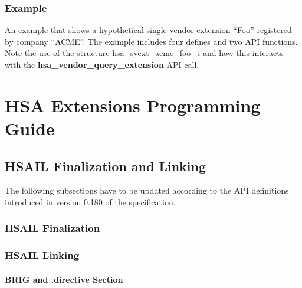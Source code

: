 \documentclass[final]{book}
\newcommand{\reffun}[1]{\textbf{#1}}
\newcommand{\reftyp}[1]{#1}
\begin{document}
\subsection{Example}
An example that shows a hypothetical single-vendor extension ``Foo'' registered
by company ``ACME''. The example includes four defines and two API functions.
Note the use of the structure \reftyp{hsa_svext_acme_foo_t} and how this
interacts with the \reffun{hsa_vendor_query_extension} API call.













\chapter{HSA Extensions Programming Guide}

\section{HSAIL Finalization and Linking}
\label{finalizerchapter} \hypertarget{finalizerchapter}{}

The following subsections have to be updated according to the API definitions
introduced in version 0.180 of the specification.


\hypertarget{finalizer}{}\subsection{HSAIL Finalization}\label{finalizer}

\hypertarget{linking}{}\subsection{HSAIL Linking}\label{linking}





\subsubsection{BRIG and .directive Section}
\end{document}
